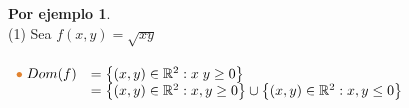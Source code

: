 \documentclass{article}
\theoremstyle{definition}
\theoremstyle{definition}
\newtheorem*{ej}{Por ejemplo}
\theoremstyle{remark}
\begin{document}
\pagebreak 
\begin{ej}
  \; \\
  \textcolor{verdep2}{(1)} Sea $f(x,y)=\sqrt{xy}$ \quad {} \\\\
 $\begin{array}{ll}
   \textcolor{rojop2}{\bullet}\;  Dom(f) & =\big\{(x,y) \in \mathbb{R}^2 : x\phantom{,}y \geq 0 \big\} \\ 
           & = \big\{(x,y) \in \mathbb{R}^2 : x,y \geq 0 \big\} \cup \big\{(x,y) \in \mathbb{R}^2 : x,y \leq 0 \big\}
  \end{array}$
\end{ej}
\begin{figure}[h]
\centering
\def\svgwidth{0.55\textwidth}

\end{figure} \; \\
\end{document}
